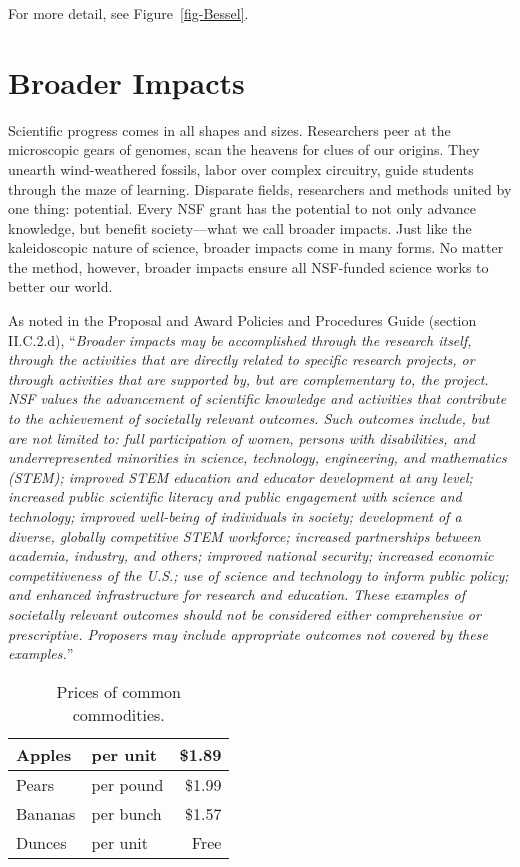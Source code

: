 \documentclass[11pt]{article} %
\begin{document}
For more detail, see Figure~\ref{fig-Bessel}.

\section{Broader Impacts\label{sec:BI}}

Scientific progress comes in all shapes and sizes. Researchers peer at the microscopic gears of genomes, scan the heavens for clues of our origins. They unearth wind-weathered fossils, labor over complex circuitry, guide students through the maze of learning. Disparate fields, researchers and methods united by one thing: potential. Every NSF grant has the potential to not only advance knowledge, but benefit society---what we call broader impacts. Just like the kaleidoscopic nature of science, broader impacts come in many forms. No matter the method, however, broader impacts ensure all NSF-funded science works to better our world.

As noted in the Proposal and Award Policies and Procedures Guide (section II.C.2.d), ``\textit{Broader impacts may be accomplished through the research itself, through the activities that are directly related to specific research projects, or through activities that are supported by, but are complementary to, the project. NSF values the advancement of scientific knowledge and activities that contribute to the achievement of societally relevant outcomes. Such outcomes include, but are not limited to: full participation of women, persons with disabilities, and underrepresented minorities in science, technology, engineering, and mathematics (STEM); improved STEM education and educator development at any level; increased public scientific literacy and public engagement with science and technology; improved well-being of individuals in society; development of a diverse, globally competitive STEM workforce; increased partnerships between academia, industry, and others; improved national security; increased economic competitiveness of the U.S.; use of science and technology to inform public policy; and enhanced infrastructure for research and education. These examples of societally relevant outcomes should not be considered either comprehensive or prescriptive. Proposers may include appropriate outcomes not covered by these examples.}''

\begin{table}
 \begin{center}
  \begin{tabular}{|l|l|r|}
  \hline
   Apples & per unit & \$1.89 \\
  \hline
   Pears & per pound & \$1.99 \\
  \hline
   Bananas & per bunch & \$1.57 \\
  \hline
   Dunces & per unit & Free \\
   \hline
  \end{tabular}
 \end{center}
 \caption{Prices of common commodities.}
 \label{table-prices}
\end{table}
\end{document}
